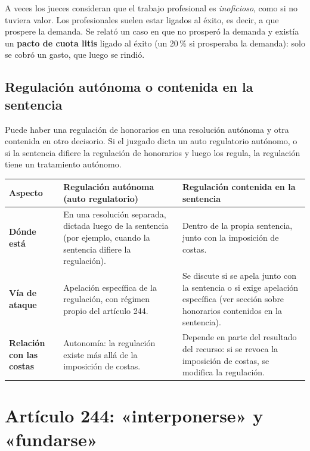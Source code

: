 \documentclass[12pt,oneside]{book}
\begin{document}
A veces los jueces consideran que el trabajo profesional es \emph{inoficioso}, como si no tuviera valor. Los profesionales suelen estar ligados al éxito, es decir, a que prospere la demanda. Se relató un caso en que no prosperó la demanda y existía un \textbf{pacto de cuota litis} ligado al éxito (un 20\,\% si prosperaba la demanda): solo se cobró un gasto, que luego se rindió.

\subsection{Regulación autónoma o contenida en la sentencia}

Puede haber una regulación de honorarios en una resolución autónoma y otra contenida en otro decisorio. Si el juzgado dicta un auto regulatorio autónomo, o si la sentencia difiere la regulación de honorarios y luego los regula, la regulación tiene un tratamiento autónomo.

\begin{table}[H]
\centering
\begin{tabularx}{\textwidth}{>{\raggedright\arraybackslash}p{}>{\raggedright\arraybackslash}X>{\raggedright\arraybackslash}X}
\toprule
\textbf{Aspecto} & \textbf{Regulación autónoma (auto regulatorio)} & \textbf{Regulación contenida en la sentencia} \\
\midrule
\textbf{Dónde está} & En una resolución separada, dictada luego de la sentencia (por ejemplo, cuando la sentencia difiere la regulación). & Dentro de la propia sentencia, junto con la imposición de costas. \\
\textbf{Vía de ataque} & Apelación específica de la regulación, con régimen propio del artículo 244. & Se discute si se apela junto con la sentencia o si exige apelación específica (ver sección sobre honorarios contenidos en la sentencia). \\
\textbf{Relación con las costas} & Autonomía: la regulación existe más allá de la imposición de costas. & Depende en parte del resultado del recurso: si se revoca la imposición de costas, se modifica la regulación. \\
\bottomrule
\end{tabularx}
\end{table}

\section{Artículo 244: «interponerse» y «fundarse»}
\end{document}
